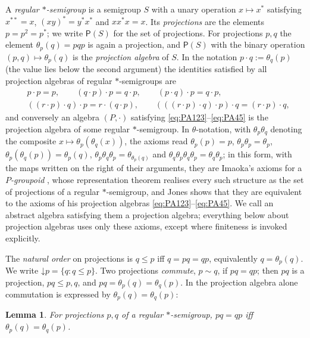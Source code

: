 \documentclass[11pt]{amsart}
\newtheorem{lemma}[theorem]{Lemma}
\theoremstyle{definition}
\newcommand{\PA}{\mathsf{P}}         %
\newcommand{\dn}{\mathord\downarrow}
\begin{document}
A \emph{regular $*$-semigroup} is a semigroup $S$ with a unary operation $x\mapsto x^*$ satisfying $x^{**}=x$, $(xy)^*=y^*x^*$ and $xx^*x=x$. Its \emph{projections} are the elements $p=p^2=p^*$; we write $\PA(S)$ for the set of projections. For projections $p,q$ the element $\theta_p(q)=pqp$ is again a projection, and $\PA(S)$ with the binary operation $(p,q)\mapsto\theta_p(q)$ is the \emph{projection algebra} of $S$. In the notation $p\cdot q:=\theta_q(p)$ (the value lies below the second argument) the identities satisfied by all projection algebras of regular $*$-semigroups are
\begin{align}
&p\cdot p=p, \qquad (q\cdot p)\cdot p=q\cdot p, \qquad (p\cdot q)\cdot p=q\cdot p,\label{eq:PA123}\\
&((r\cdot p)\cdot q)\cdot p=r\cdot(q\cdot p), \qquad (((r\cdot p)\cdot q)\cdot p)\cdot q=(r\cdot p)\cdot q,\label{eq:PA45}
\end{align}
and conversely an algebra $(P,\cdot)$ satisfying \eqref{eq:PA123}--\eqref{eq:PA45} is the projection algebra of some regular $*$-semigroup. In $\theta$-notation, with $\theta_p\theta_q$ denoting the composite $x\mapsto\theta_p(\theta_q(x))$, the axioms read $\theta_p(p)=p$, $\theta_p\theta_p=\theta_p$, $\theta_p(\theta_q(p))=\theta_p(q)$, $\theta_p\theta_q\theta_p=\theta_{\theta_p(q)}$ and $\theta_q\theta_p\theta_q\theta_p=\theta_q\theta_p$; in this form, with the maps written on the right of their arguments, they are Imaoka's axioms for a \emph{$P$-groupoid} \cite{Imaoka81}, whose representation theorem \cite{Imaoka80} realises every such structure as the set of projections of a regular $*$-semigroup, and Jones \cite[Section~7]{Jones} shows that they are equivalent to the axioms of his projection algebras \eqref{eq:PA123}--\eqref{eq:PA45}. We call an abstract algebra satisfying them a projection algebra; everything below about projection algebras uses only these axioms, except where finiteness is invoked explicitly.

The \emph{natural order} on projections is $q\le p$ iff $q=pq=qp$, equivalently $q=\theta_p(q)$. We write $\dn p=\{q:q\le p\}$. Two projections \emph{commute}, $p\sim q$, if $pq=qp$; then $pq$ is a projection, $pq\le p,q$, and $pq=\theta_p(q)=\theta_q(p)$. In the projection algebra alone commutation is expressed by $\theta_p(q)=\theta_q(p)$:

\begin{lemma}\label{lem:comm}
For projections $p,q$ of a regular $*$-semigroup, $pq=qp$ iff $\theta_p(q)=\theta_q(p)$.
\end{lemma}
\end{document}
